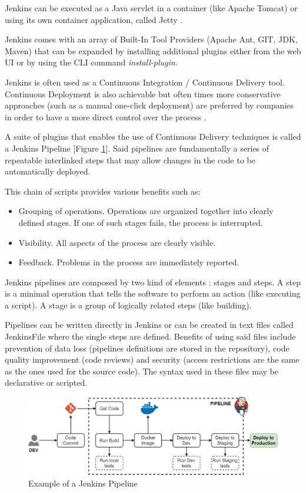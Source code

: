 Jenkins can be executed as a Java servlet in a container (like Apache Tomcat) or using its own container application, called Jetty \cite[p.~51]{JenkinsGuide}.

Jenkins comes with an array of Built-In Tool Providers (Apache Ant, GIT, JDK, Maven) that can be expanded by installing additional plugins either from the web UI or by using the CLI command \textit{install-plugin}.

Jenkins is often used as a Continuous Integration / Continuous Delivery tool.
Continuous Deployment is also achievable but often times more conservative approaches (such as a manual one-click deployment) are preferred by companies in order to have a more direct control over the process \cite[p.~325]{JenkinsGuide}.

A suite of plugins that enables the use of Continuous Delivery techniques is called a Jenkins Pipeline [Figure \ref{fig:jenkinsPipeline}].
Said pipelines are fundamentally a series of repeatable interlinked steps that may allow changes in the code to be automatically deployed.

This chain of scripts provides various benefits \cite[p.~165]{JenkinsCD} such as:
\begin{itemize}
  \item Grouping of operations. Operations are organized together into clearly defined stages. If one of such stages fails, the process is interrupted.
  \item Visibility. All aspects of the process are clearly visible.
  \item Feedback. Problems in the process are immediately reported.
\end{itemize}

Jenkins pipelines are composed by two kind of elements \cite[p.~166]{JenkinsCD}: stages and steps. A step is a minimal operation that tells the software to perform an action (like executing a script). A stage is a group of logically related steps (like building).

Pipelines can be written directly in Jenkins or can be created in text files called JenkinsFile \cite[p.~186]{JenkinsCD} where the single steps are defined.
Benefits of using said files include prevention of data loss (pipelines definitions are stored in the repository), code quality improvement (code reviews) and security (access restrictions are the same as the ones used for the source code).
The syntax used in these files may be declarative or scripted.

\begin{figure}[ht]
	\centering
	\includegraphics[scale=0.5]{Images/JenkisPipeline.pdf}
	\caption{Example of a Jenkins Pipeline}
	\label{fig:jenkinsPipeline}
\end{figure}

